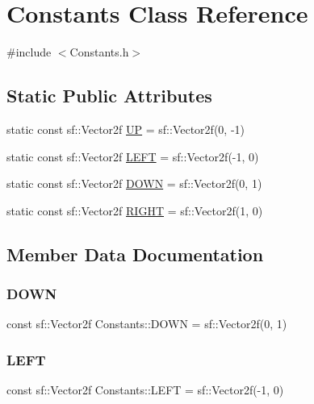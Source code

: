 \hypertarget{class_constants}{}\section{Constants Class Reference}
\label{class_constants}


{\ttfamily \#include $<$Constants.\+h$>$}

\subsection*{Static Public Attributes}
\begin{DoxyCompactItemize}
\item 
static const sf\+::\+Vector2f \hyperlink{class_constants_aca8e6566167ac5cefb2f7788dadce9fd}{UP} = sf\+::\+Vector2f(0, -\/1)
\item 
static const sf\+::\+Vector2f \hyperlink{class_constants_aab66fd6a187457cd4a502e23628ff060}{L\+E\+FT} = sf\+::\+Vector2f(-\/1, 0)
\item 
static const sf\+::\+Vector2f \hyperlink{class_constants_abfd7bad22b462831c90ca8ce2d1821ea}{D\+O\+WN} = sf\+::\+Vector2f(0, 1)
\item 
static const sf\+::\+Vector2f \hyperlink{class_constants_ae609d0dae2354ed9bd69e1fe8262643e}{R\+I\+G\+HT} = sf\+::\+Vector2f(1, 0)
\end{DoxyCompactItemize}


\subsection{Member Data Documentation}
\hypertarget{class_constants_abfd7bad22b462831c90ca8ce2d1821ea}{}\label{class_constants_abfd7bad22b462831c90ca8ce2d1821ea} 
\subsubsection{\texorpdfstring{D\+O\+WN}{DOWN}}
{\footnotesize\ttfamily const sf\+::\+Vector2f Constants\+::\+D\+O\+WN = sf\+::\+Vector2f(0, 1)\hspace{0.3cm}{\ttfamily [static]}}

\hypertarget{class_constants_aab66fd6a187457cd4a502e23628ff060}{}\label{class_constants_aab66fd6a187457cd4a502e23628ff060} 
\subsubsection{\texorpdfstring{L\+E\+FT}{LEFT}}
{\footnotesize\ttfamily const sf\+::\+Vector2f Constants\+::\+L\+E\+FT = sf\+::\+Vector2f(-\/1, 0)\hspace{0.3cm}{\ttfamily [static]}}

